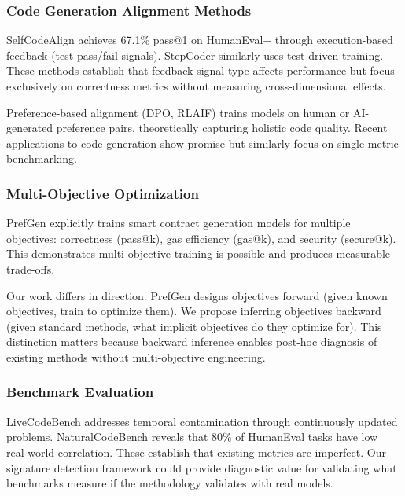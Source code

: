 
\subsubsection{Code Generation Alignment Methods}

SelfCodeAlign achieves 67.1\% pass@1 on HumanEval+ through execution-based feedback (test pass/fail signals). StepCoder similarly uses test-driven training. These methods establish that feedback signal type affects performance but focus exclusively on correctness metrics without measuring cross-dimensional effects.

Preference-based alignment (DPO, RLAIF) trains models on human or AI-generated preference pairs, theoretically capturing holistic code quality. Recent applications to code generation show promise but similarly focus on single-metric benchmarking.

\subsubsection{Multi-Objective Optimization}

PrefGen explicitly trains smart contract generation models for multiple objectives: correctness (pass@k), gas efficiency (gas@k), and security (secure@k). This demonstrates multi-objective training is possible and produces measurable trade-offs.

Our work differs in direction. PrefGen designs objectives forward (given known objectives, train to optimize them). We propose inferring objectives backward (given standard methods, what implicit objectives do they optimize for). This distinction matters because backward inference enables post-hoc diagnosis of existing methods without multi-objective engineering.

\subsubsection{Benchmark Evaluation}

LiveCodeBench addresses temporal contamination through continuously updated problems. NaturalCodeBench reveals that 80\% of HumanEval tasks have low real-world correlation. These establish that existing metrics are imperfect. Our signature detection framework could provide diagnostic value for validating what benchmarks measure if the methodology validates with real models.

